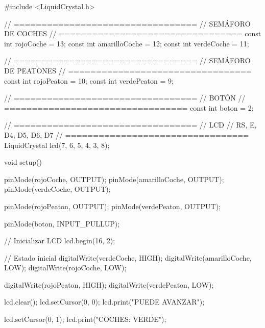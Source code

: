 #include <LiquidCrystal.h>

// =================================
// SEMÁFORO DE COCHES
// =================================
const int rojoCoche = 13;
const int amarilloCoche = 12;
const int verdeCoche = 11;

// =================================
// SEMÁFORO DE PEATONES
// =================================
const int rojoPeaton = 10;
const int verdePeaton = 9;

// =================================
// BOTÓN
// =================================
const int boton = 2;

// =================================
// LCD
// RS, E, D4, D5, D6, D7
// =================================
LiquidCrystal lcd(7, 6, 5, 4, 3, 8);

void setup() {

  pinMode(rojoCoche, OUTPUT);
  pinMode(amarilloCoche, OUTPUT);
  pinMode(verdeCoche, OUTPUT);

  pinMode(rojoPeaton, OUTPUT);
  pinMode(verdePeaton, OUTPUT);

  pinMode(boton, INPUT_PULLUP);

  // Inicializar LCD
  lcd.begin(16, 2);

  // Estado inicial
  digitalWrite(verdeCoche, HIGH);
  digitalWrite(amarilloCoche, LOW);
  digitalWrite(rojoCoche, LOW);

  digitalWrite(rojoPeaton, HIGH);
  digitalWrite(verdePeaton, LOW);

  lcd.clear();
  lcd.setCursor(0, 0);
  lcd.print("PUEDE AVANZAR");

  lcd.setCursor(0, 1);
  lcd.print("COCHES: VERDE");
}

